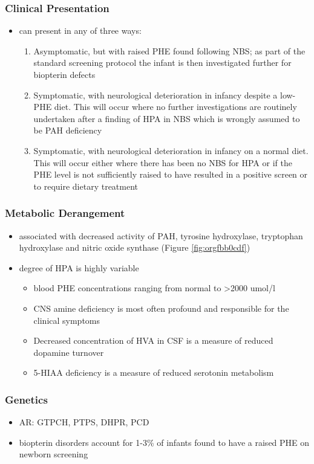 \documentclass{scrartcl}
\begin{document}
\subsubsection{Clinical Presentation}
\label{sec:org81caf30}
\begin{itemize}
\item can present in any of three ways:
\begin{enumerate}
\item Asymptomatic, but with raised PHE found following NBS; as part of
the standard screening protocol the infant is then investigated
further for biopterin defects
\item Symptomatic, with neurological deterioration in infancy despite a
low-PHE diet. This will occur where no further investigations are
routinely undertaken after a finding of HPA in NBS which is
wrongly assumed to be PAH deficiency
\item Symptomatic, with neurological deterioration in infancy on a
normal diet. This will occur either where there has been no NBS
for HPA or if the PHE level is not sufficiently raised to have
resulted in a positive screen or to require dietary treatment
\end{enumerate}
\end{itemize}
\subsubsection{Metabolic Derangement}
\label{sec:org6137df3}
\begin{itemize}
\item associated with decreased activity of PAH, tyrosine hydroxylase,
tryptophan hydroxylase and nitric oxide synthase (Figure \ref{fig:orgfbb0cdf})
\item degree of HPA is highly variable
\begin{itemize}
\item blood PHE concentrations ranging from normal to \textgreater{}2000 umol/l
\item CNS amine deficiency is most often profound and responsible for
the clinical symptoms
\item Decreased concentration of HVA in CSF is a measure of reduced
dopamine turnover
\item 5-HIAA deficiency is a measure of reduced serotonin metabolism
\end{itemize}
\end{itemize}

\subsubsection{Genetics}
\label{sec:org91b8cc9}
\begin{itemize}
\item AR: GTPCH, PTPS, DHPR, PCD
\item biopterin disorders account for 1-3\% of infants found to have a
raised PHE on newborn screening
\end{itemize}
\end{document}
